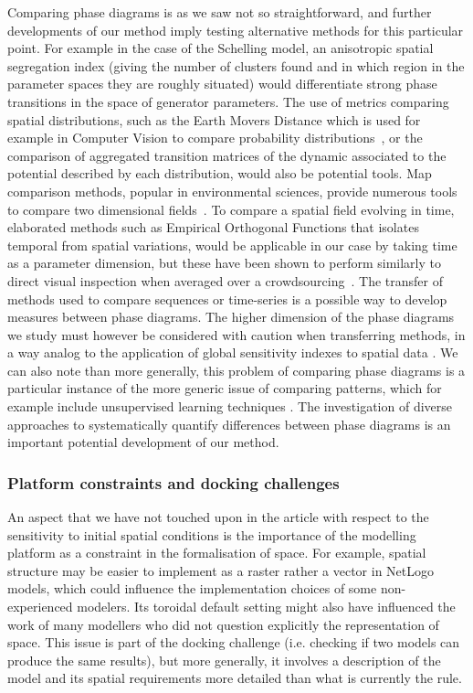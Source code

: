 \documentclass{JASSS}
\begin{document}
Comparing phase diagrams is as we saw not so straightforward, and further developments of our method imply testing alternative methods for this particular point. For example in the case of the Schelling model, an anisotropic spatial segregation index (giving the number of clusters found and in which region in the parameter spaces they are roughly situated) would differentiate strong phase transitions in the space of generator parameters. The use of metrics comparing spatial distributions, such as the Earth Movers Distance which is used for example in Computer Vision to compare probability distributions~\citep{rubner2000earth}, or the comparison of aggregated transition matrices of the dynamic associated to the potential described by each distribution, would also be potential tools. Map comparison methods, popular in environmental sciences, provide numerous tools to compare two dimensional fields~\citep{visser2006map,kuhnert2005comparing}. To compare a spatial field evolving in time, elaborated methods such as Empirical Orthogonal Functions that isolates temporal from spatial variations, would be applicable in our case by taking time as a parameter dimension, but these have been shown to perform similarly to direct visual inspection when averaged over a crowdsourcing~\citep{10.1371/journal.pone.0178165}. The transfer of methods used to compare sequences \citep{kruskal1983overview} or time-series \citep{liao2005clustering} is a possible way to develop measures between phase diagrams. The higher dimension of the phase diagrams we study must however be considered with caution when transferring methods, in a way analog to the application of global sensitivity indexes to spatial data \citep{lilburne2009sensitivity}. We can also note than more generally, this problem of comparing phase diagrams is a particular instance of the more generic issue of comparing patterns, which for example include unsupervised learning techniques \citep{hastie2009unsupervised}. The investigation of diverse approaches to systematically quantify differences between phase diagrams is an important potential development of our method.

\subsubsection{Platform constraints and docking challenges}

An aspect that we have not touched upon in the article with respect to the sensitivity to initial spatial conditions is the importance of the modelling platform as a constraint in the formalisation of space. For example, spatial structure may be easier to implement as a raster rather a vector in NetLogo models, which could influence the implementation choices of some non-experienced modelers. Its toroidal default setting might also have influenced the work of many modellers who did not question explicitly the representation of space. This issue is part of the docking challenge \citep{Axtelletal1996} (i.e. checking if two models can produce the same results), but more generally, it involves a description of the model and its spatial requirements more detailed than what is currently the rule.
\end{document}
